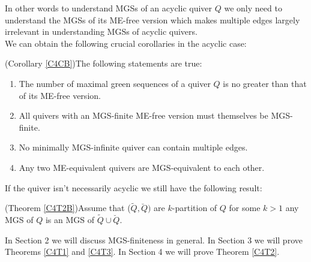\indent In other words to understand MGSs of an acyclic quiver $Q$ we only need to understand the MGSs of its ME-free version which makes multiple edges largely irrelevant in understanding MGSs of acyclic quivers.\\
\indent We can obtain the following crucial corollaries in the acyclic case:
\begin{corollary}\label{C4C}
(Corollary \ref{C4CB})The following statements are true:
\begin{enumerate}
\item The number of maximal green sequences of a quiver $Q$ is no greater than that of its ME-free version.
\item All quivers with an MGS-finite ME-free version must themselves be MGS-finite.
\item No minimally MGS-infinite quiver can contain multiple edges.
\item Any two ME-equivalent quivers are MGS-equivalent to each other.
\end{enumerate}
\end{corollary}
\indent If the quiver isn't necessarily acyclic we still have the following result:
\begin{theorem}
(Theorem \ref{C4T2B})Assume that ($\tilde{Q},\breve{Q})$ are $k$-partition of $Q$ for some $k>1$ any MGS of $Q$ is an MGS of $\tilde{Q}\cup\breve{Q}$.\label{C4T2}
\end{theorem}
\indent In Section 2 we will discuss MGS-finiteness in general. In Section 3 we will prove Theorems \ref{C4T1} and \ref{C4T3}. In Section 4 we will prove Theorem \ref{C4T2}.
